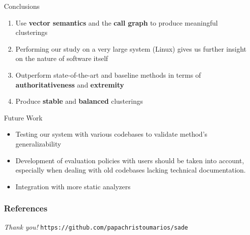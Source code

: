 \documentclass{beamer}
\begin{document}
\begin{frame}{Conclusions}

\begin{enumerate}
    \item<1-> Use \textbf{vector semantics} and the \textbf{call graph} to produce meaningful clusterings
    \item<2-> Performing our study on a very large system (Linux) gives us further insight on the nature of software itself
    \item<3-> Outperform state-of-the-art and baseline methods in terms of \textbf{authoritativeness} and \textbf{extremity}
    \item<4-> Produce \textbf{stable} and \textbf{balanced} clusterings 
\end{enumerate}
    
\end{frame}

\begin{frame}{Future Work}

\begin{itemize}
    \item Testing our system with various codebases to validate method's generalizability
    \item Development of evaluation policies with users should be taken into account, especially when dealing with old codebases lacking technical documentation.
    \item Integration with more static analyzers 
\end{itemize}
    
\end{frame}


\begin{frame}[allowframebreaks]
\frametitle{References}


\end{frame}
 

\begin{frame}{}
  \centering \Large {
  \emph{Thank you!}}
  \texttt{https://github.com/papachristoumarios/sade}
\end{frame}
 
 
\end{document}
